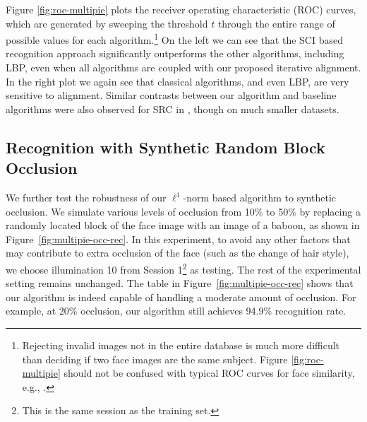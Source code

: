 Figure \ref{fig:roc-multipie} plots the receiver operating
characteristic (ROC) curves, which are generated by sweeping
the threshold $t$ through the entire range of possible values
for each algorithm.\footnote{Rejecting invalid images not in
the entire database is much more difficult than deciding if two
face images are the same subject. Figure \ref{fig:roc-multipie}
should not be confused with typical ROC curves for face
similarity, e.g., \cite{PhillipsP2007}.} On the left we can see
that the SCI based recognition approach significantly
outperforms the other algorithms, including LBP, even when all
algorithms are coupled with our proposed iterative alignment.
In the right plot we again see that classical algorithms, and
even LBP, are very sensitive to alignment.  Similar contrasts
between our algorithm and baseline algorithms were also
observed for SRC in \cite{Wright2009-PAMI}, though on much
smaller datasets.

\subsection{Recognition with Synthetic Random Block Occlusion}

We further test the robustness of our $\ell^1$-norm based
algorithm to synthetic occlusion. We simulate various levels of
occlusion from 10\% to 50\% by replacing a randomly located
block of the face image with an image of a baboon, as shown in
Figure~\ref{fig:multipie-occ-rec}. In this experiment, to avoid
any other factors that may contribute to extra occlusion of the
face (such as the change of hair style), we choose illumination
10 from Session 1\footnote{This is the same session as the
training set.} as testing. The rest of the experimental setting
remains unchanged. The table in
Figure~\ref{fig:multipie-occ-rec} shows that our algorithm is
indeed capable of handling a moderate amount of occlusion. For
example, at 20\% occlusion, our algorithm still achieves 94.9\%
recognition rate.

